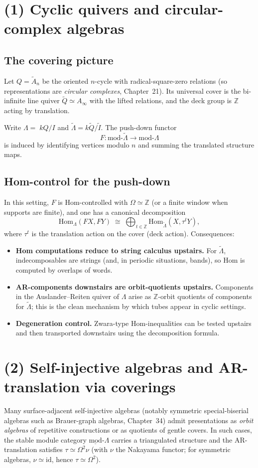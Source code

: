 \documentclass[11pt,oneside]{amsbook}
\numberwithin{equation}{section}
\theoremstyle{plain}
\theoremstyle{definition}
\theoremstyle{remark}
\begin{document}
\section{(1) Cyclic quivers and circular-complex algebras}
\subsection{The covering picture}
Let $Q=\widetilde{A}_n$ be the oriented $n$-cycle with radical-square-zero relations (so representations are
\emph{circular complexes}, Chapter~21). Its universal cover is the bi-infinite line quiver $\widetilde{Q}\simeq A_\infty$
with the lifted relations, and the deck group is $\mathbb{Z}$ acting by translation.

Write $\Lambda=\;kQ/I$ and $\widetilde{\Lambda}=k\widetilde{Q}/\widetilde{I}$. The push-down functor
\[
F:\mathrm{mod}\text{-}\widetilde{\Lambda}\longrightarrow \mathrm{mod}\text{-}\Lambda
\]
is induced by identifying vertices modulo $n$ and summing the translated structure maps.

\subsection{Hom-control for the push-down}
In this setting, $F$ is Hom-controlled with $\Omega\simeq\mathbb{Z}$ (or a finite window when supports are
finite), and one has a canonical decomposition
\[
\mathrm{Hom}_\Lambda(FX,FY)\;\cong\;\bigoplus_{t\in\mathbb{Z}}\mathrm{Hom}_{\widetilde{\Lambda}}(X, \tau^t Y),
\]
where $\tau^t$ is the translation action on the cover (deck action).
Consequences:
\begin{itemize}
\item \textbf{Hom computations reduce to string calculus upstairs.} For $\widetilde{\Lambda}$, indecomposables are
strings (and, in periodic situations, bands), so $\mathrm{Hom}$ is computed by overlaps of words.
\item \textbf{AR-components downstairs are orbit-quotients upstairs.} Components in the Auslander--Reiten quiver of
$\Lambda$ arise as $\mathbb{Z}$-orbit quotients of components for $\widetilde{\Lambda}$; this is the clean mechanism by
which tubes appear in cyclic settings.
\item \textbf{Degeneration control.} Zwara-type Hom-inequalities can be tested upstairs and then transported
downstairs using the decomposition formula.
\end{itemize}

\section{(2) Self-injective algebras and AR-translation via coverings}
Many surface-adjacent self-injective algebras (notably symmetric special-biserial algebras such as Brauer-graph
algebras, Chapter~34) admit presentations as \emph{orbit algebras} of repetitive constructions or as quotients of
gentle covers. In such cases, the stable module category $\underline{\mathrm{mod}}\text{-}\Lambda$ carries a triangulated
structure and the AR-translation satisfies $\tau \simeq \Omega^2\nu$ (with $\nu$ the Nakayama functor; for symmetric
algebras, $\nu\simeq\mathrm{id}$, hence $\tau\simeq\Omega^2$).
\end{document}
